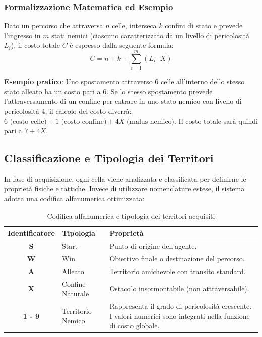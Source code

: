 \documentclass[12pt,a4paper]{article}
\begin{document}
	\subsubsection*{Formalizzazione Matematica ed Esempio}
	Dato un percorso che attraversa $n$ celle, interseca $k$ confini di stato e prevede l'ingresso in $m$ stati nemici (ciascuno caratterizzato da un livello di pericolosità $L_i$), il costo totale $C$ è espresso dalla seguente formula:
	\begin{equation}
		C = n + k + \sum_{i=1}^{m} (L_i \cdot X)
	\end{equation}

	\textbf{Esempio pratico}: Uno spostamento attraverso 6 celle all'interno dello stesso stato alleato ha un costo pari a 6. Se lo stesso spostamento prevede l'attraversamento di un confine per entrare in uno stato nemico con livello di pericolosità 4, il calcolo del costo diverrà: $6 \text{ (costo celle)} + 1 \text{ (costo confine)} + 4X \text{ (malus nemico)}$. Il costo totale sarà quindi pari a $7 + 4X$.

	\subsection{Classificazione e Tipologia dei Territori}
	In fase di acquisizione, ogni cella viene analizzata e classificata per definirne le proprietà fisiche e tattiche. Invece di utilizzare nomenclature estese, il sistema adotta una codifica alfanumerica ottimizzata:

	\begin{table}[h!]
		\centering
		\renewcommand{\arraystretch}{1.3}
		\begin{tabular}{|c|l|p{8.5cm}|}
			\hline \textbf{Identificatore} & \textbf{Tipologia} & \textbf{Proprietà} \\ \hline
			\textbf{S} & Start & Punto di origine dell'agente. \\ \hline
			\textbf{W} & Win & Obiettivo finale o destinazione del percorso. \\ \hline
			\textbf{A} & Alleato & Territorio amichevole con transito standard. \\ \hline
			\textbf{X} & Confine Naturale & Ostacolo insormontabile (non attraversabile). \\ \hline
			\textbf{1 - 9} & Territorio Nemico & Rappresenta il grado di pericolosità crescente. I valori numerici sono integrati nella funzione di costo globale. \\ \hline
		\end{tabular}
		\caption{Codifica alfanumerica e tipologia dei territori acquisiti}
	\end{table}
\end{document}
